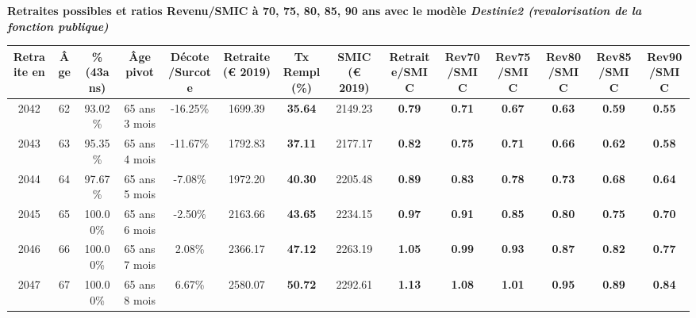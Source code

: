  \vspace{0.1cm} 
{\bf \noindent Retraites possibles et ratios Revenu/SMIC à 70, 75, 80, 85, 90 ans avec le modèle \emph{Destinie2 (revalorisation de la fonction publique)}}  
 
\begin{adjustbox}{max width=\textwidth} 
\begin{tabular}[htb]{|c|c||c|c|c||c|c||c||c|c|c|c|c|c|} 
\hline 
 Retraite en &  Âge &  \%(43ans) &  Âge pivot &  Décote/Surcote &  Retraite (\euro{} 2019) &  Tx Rempl(\%) &  SMIC (\euro{} 2019) &  Retraite/SMIC &  Rev70/SMIC &  Rev75/SMIC &  Rev80/SMIC &  Rev85/SMIC &  Rev90/SMIC \\ 
\hline \hline 
 2042 &  62 &  93.02\% &  65 ans 3 mois &  -16.25\% &  1699.39 &  {\bf 35.64} &  2149.23 &  {\bf {\color{red} 0.79}} &  {\bf {\color{red} 0.71}} &  {\bf {\color{red} 0.67}} &  {\bf {\color{red} 0.63}} &  {\bf {\color{red} 0.59}} &  {\bf {\color{red} 0.55}} \\ 
\hline 
 2043 &  63 &  95.35\% &  65 ans 4 mois &  -11.67\% &  1792.83 &  {\bf 37.11} &  2177.17 &  {\bf {\color{red} 0.82}} &  {\bf {\color{red} 0.75}} &  {\bf {\color{red} 0.71}} &  {\bf {\color{red} 0.66}} &  {\bf {\color{red} 0.62}} &  {\bf {\color{red} 0.58}} \\ 
\hline 
 2044 &  64 &  97.67\% &  65 ans 5 mois &  -7.08\% &  1972.20 &  {\bf 40.30} &  2205.48 &  {\bf {\color{red} 0.89}} &  {\bf {\color{red} 0.83}} &  {\bf {\color{red} 0.78}} &  {\bf {\color{red} 0.73}} &  {\bf {\color{red} 0.68}} &  {\bf {\color{red} 0.64}} \\ 
\hline 
 2045 &  65 &  100.00\% &  65 ans 6 mois &  -2.50\% &  2163.66 &  {\bf 43.65} &  2234.15 &  {\bf {\color{red} 0.97}} &  {\bf {\color{red} 0.91}} &  {\bf {\color{red} 0.85}} &  {\bf {\color{red} 0.80}} &  {\bf {\color{red} 0.75}} &  {\bf {\color{red} 0.70}} \\ 
\hline 
 2046 &  66 &  100.00\% &  65 ans 7 mois &  2.08\% &  2366.17 &  {\bf 47.12} &  2263.19 &  {\bf 1.05} &  {\bf {\color{red} 0.99}} &  {\bf {\color{red} 0.93}} &  {\bf {\color{red} 0.87}} &  {\bf {\color{red} 0.82}} &  {\bf {\color{red} 0.77}} \\ 
\hline 
 2047 &  67 &  100.00\% &  65 ans 8 mois &  6.67\% &  2580.07 &  {\bf 50.72} &  2292.61 &  {\bf 1.13} &  {\bf 1.08} &  {\bf 1.01} &  {\bf {\color{red} 0.95}} &  {\bf {\color{red} 0.89}} &  {\bf {\color{red} 0.84}} \\ 
\hline 
\hline 
\end{tabular} 
\end{adjustbox} 
 
